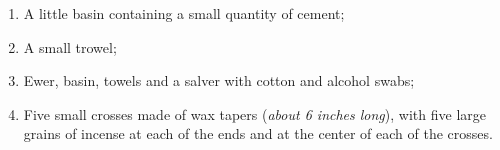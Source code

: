 \documentclass[letterpaper]{report}
\begin{document}
{\begin{enumerate}[label=\Roman*.]
\begin{enumerate}[label=\arabic*.]
                \item A little basin containing a small quantity of cement;

                \item A small trowel;

                \item Ewer, basin, towels and a salver with cotton and alcohol swabs;

                \item Five small crosses made of wax tapers (\textit{about 6
                    inches long}), with five large grains of incense at each of 
                    the ends and at the center of each of the crosses.

            \end{enumerate}

        

    \end{enumerate}

}
\end{document}
